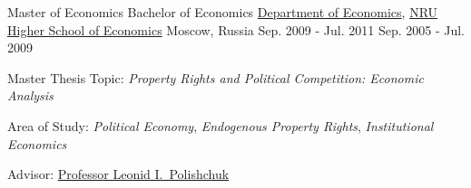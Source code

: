 \begin{cventries}
\cventry
    {Master of Economics \newline Bachelor of Economics} %
    {\href{http://economics.hse.ru/en/}{Department of Economics}, \href{http://www.hse.ru/en/}{NRU Higher School of Economics}} %
    {Moscow, Russia} %
    {Sep. 2009 - Jul. 2011 \newline Sep. 2005 - Jul. 2009} %
    {
      \begin{cvitems} %
        \item {Master Thesis Topic: \emph{Property Rights and Political Competition: Economic Analysis}}
        \item {Area of Study: \emph{Political Economy}, \emph{Endogenous Property Rights}, \emph{Institutional Economics}}
        \item {Advisor: \href{http://www.hse.ru/en/org/persons/65104}{Professor Leonid I.~Polishchuk}}
      \end{cvitems}
    }

\end{cventries}
